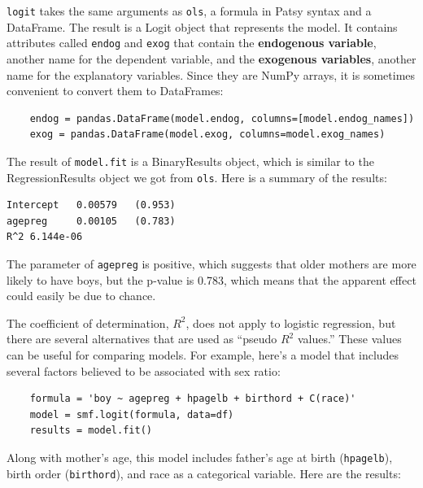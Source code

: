 \documentclass[12pt]{book}
\begin{document}
\verb"logit" takes the same arguments as \verb"ols", a formula
in Patsy syntax and a DataFrame.  The result is a Logit object
that represents the model.  It contains attributes called
\verb"endog" and \verb"exog" that contain the {\bf endogenous
variable}, another name for the dependent variable,
and the {\bf exogenous variables}, another name for the
explanatory variables.  Since they are NumPy arrays, it is
sometimes convenient to convert them to DataFrames:

\begin{verbatim}
    endog = pandas.DataFrame(model.endog, columns=[model.endog_names])
    exog = pandas.DataFrame(model.exog, columns=model.exog_names)
\end{verbatim}

The result of \verb"model.fit" is a BinaryResults object, which is
similar to the RegressionResults object we got from \verb"ols".
Here is a summary of the results:

\begin{verbatim}
Intercept   0.00579   (0.953)
agepreg     0.00105   (0.783)
R^2 6.144e-06
\end{verbatim}

The parameter of \verb"agepreg" is positive, which suggests that
older mothers are more likely to have boys, but the p-value is
0.783, which means that the apparent effect could easily be due
to chance.

The coefficient of determination, $R^2$, does not apply to logistic
regression, but there are several alternatives that are used
as ``pseudo $R^2$ values.''  These values can be useful for comparing
models.  For example, here's a model that includes several factors
believed to be associated with sex ratio:

\begin{verbatim}
    formula = 'boy ~ agepreg + hpagelb + birthord + C(race)'
    model = smf.logit(formula, data=df)
    results = model.fit()
\end{verbatim}

Along with mother's age, this model includes father's age at
birth (\verb"hpagelb"), birth order (\verb"birthord"), and
race as a categorical variable.  Here are the results:
\end{document}
